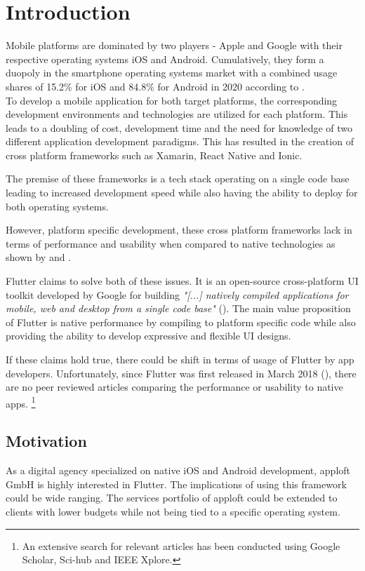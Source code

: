\chapter{Introduction}
Mobile platforms are dominated by two players - Apple and Google with their respective operating systems iOS and Android. 
Cumulatively, they form a duopoly in the smartphone operating systems market with a combined usage shares of 
15.2\% for iOS and 84.8\% for Android in 2020 according to \textcite{IDC2021}.
\\To develop a mobile application for both target platforms, the corresponding development environments and technologies 
are utilized for each platform. This leads to a doubling of cost, development time and 
the need for knowledge of two different application development paradigms. 
This has resulted in the creation of cross platform frameworks such as Xamarin, React Native and Ionic. 

The premise of these frameworks is a tech stack operating on a single code base leading to increased development speed
while also having the ability to deploy for both operating systems.

However, platform specific development, these cross platform frameworks lack in terms of performance and usability when compared to native technologies as shown by \textcite{Mercado2016} and \textcite{Ebone2018}.

Flutter claims to solve both of these issues. It is an open-source cross-platform UI toolkit developed by Google for building 
\textit{"[...] natively compiled applications for mobile, web and desktop from a single code base"} (\cite{FlutterDev20}). 
The main value proposition of Flutter is native performance by compiling to platform specific code 
while also providing the ability to develop expressive and flexible UI designs.

If these claims hold true, there could be shift in terms of usage of Flutter by app developers. 
Unfortunately, since Flutter was first released in March 2018 (\cite{FlutterReleases2020}), 
there are no peer reviewed articles comparing the performance or usability to native apps.
\footnote{An extensive search for relevant articles has been conducted using Google Scholar, Sci-hub and IEEE Xplore.} 

\section{Motivation}
As a digital agency specialized on native iOS and Android development, apploft GmbH is highly interested in Flutter. 
The implications of using this framework could be wide ranging. 
The services portfolio of apploft could be extended to clients with lower budgets while not being tied to a specific operating system. 

